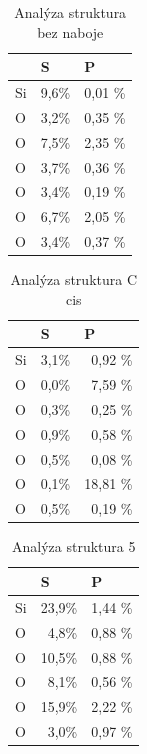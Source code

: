 \documentclass[
  digital, %
  table,   %
  lof,     %
  lot,     %
  oneside,
]{fithesis3}
\begin{document}
\begin{table}[htbp]
\caption{Analýza struktura bez naboje}
\begin{center}
\begin{tabular}{|l|r|r|}
\hline
 & \multicolumn{1}{l|}{S} & \multicolumn{1}{l|}{P} \\ \hline
Si & 9,6\% & 0,01 \% \\ \hline
O & 3,2\% & 0,35 \% \\ \hline
O & 7,5\% & 2,35 \% \\ \hline
O & 3,7\% & 0,36 \% \\ \hline
O & 3,4\% & 0,19 \% \\ \hline
O & 6,7\% & 2,05 \% \\ \hline
O & 3,4\% & 0,37 \% \\ \hline
\end{tabular}
\end{center}
\label{struktura_bez_naboje_MPA}
\end{table}

\begin{table}[htbp]
\caption{Analýza struktura C cis}
\begin{center}
\begin{tabular}{|l|r|r|}
\hline
 & \multicolumn{1}{l|}{S} & \multicolumn{1}{l|}{P} \\ \hline
Si & 3,1\% & 0,92 \% \\ \hline
O & 0,0\% & 7,59 \% \\ \hline
O & 0,3\% & 0,25 \% \\ \hline
O & 0,9\% & 0,58 \% \\ \hline
O & 0,5\% & 0,08 \% \\ \hline
O & 0,1\% & 18,81 \% \\ \hline
O & 0,5\% & 0,19 \% \\ \hline
\end{tabular}
\end{center}
\label{struktura_C_cis_MPA}
\end{table}

\begin{table}[htbp]
\caption{Analýza struktura 5}
\begin{center}
\begin{tabular}{|l|r|r|}
\hline
 & \multicolumn{1}{l|}{S} & \multicolumn{1}{l|}{P} \\ \hline
Si & 23,9\% & 1,44 \% \\ \hline
O & 4,8\% & 0,88 \% \\ \hline
O & 10,5\% & 0,88 \% \\ \hline
O & 8,1\% & 0,56 \% \\ \hline
O & 15,9\% & 2,22 \% \\ \hline
O & 3,0\% & 0,97 \% \\ \hline
\end{tabular}
\end{center}
\label{struktura_5_MPA}
\end{table}
\end{document}
